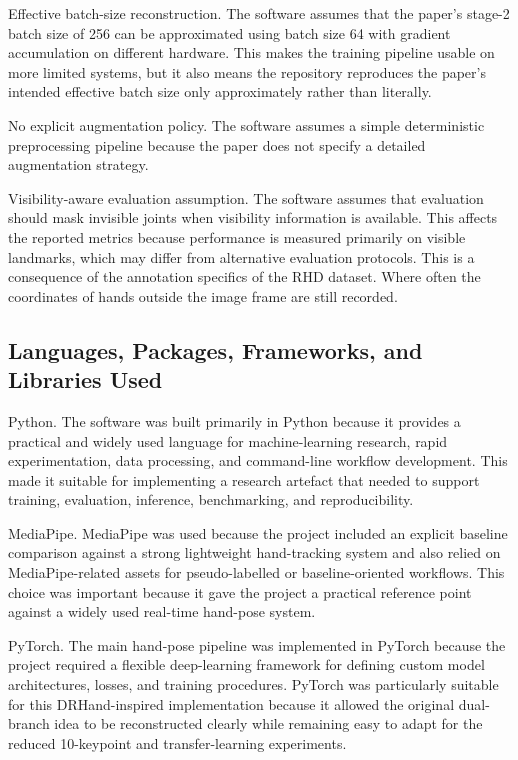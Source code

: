﻿\documentclass[11pt,a4paper]{article}
\begin{document}
\medskip

Effective batch-size reconstruction. The software assumes that the paper's stage-2 batch size of 256 can be approximated using batch size 64 with gradient accumulation on different hardware. This makes the training pipeline usable on more limited systems, but it also means the repository reproduces the paper's intended effective batch size only approximately rather than literally.

\medskip

No explicit augmentation policy. The software assumes a simple deterministic preprocessing pipeline because the paper does not specify a detailed augmentation strategy.

\medskip

Visibility-aware evaluation assumption. The software assumes that evaluation should mask invisible joints when visibility information is available. This affects the reported metrics because performance is measured primarily on visible landmarks, which may differ from alternative evaluation protocols. This is a consequence of the annotation specifics of the RHD dataset. Where often the coordinates of hands outside the image frame are still recorded.

\subsection{Languages, Packages, Frameworks, and Libraries Used}

Python. The software was built primarily in Python because it provides a practical and widely used language for machine-learning research, rapid experimentation, data processing, and command-line workflow development. This made it suitable for implementing a research artefact that needed to support training, evaluation, inference, benchmarking, and reproducibility.

\medskip

MediaPipe. MediaPipe was used because the project included an explicit baseline comparison against a strong lightweight hand-tracking system and also relied on MediaPipe-related assets for pseudo-labelled or baseline-oriented workflows. This choice was important because it gave the project a practical reference point against a widely used real-time hand-pose system.

\medskip

PyTorch. The main hand-pose pipeline was implemented in PyTorch because the project required a flexible deep-learning framework for defining custom model architectures, losses, and training procedures. PyTorch was particularly suitable for this DRHand-inspired implementation because it allowed the original dual-branch idea to be reconstructed clearly while remaining easy to adapt for the reduced 10-keypoint and transfer-learning experiments.
\end{document}
